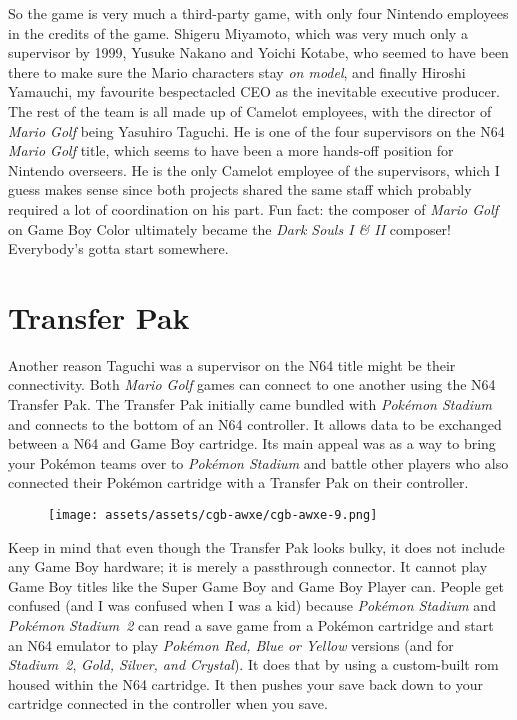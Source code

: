 \documentclass{book}
\begin{document}
So the game is very much a third-party game, with only four Nintendo employees in the credits of the game. Shigeru Miyamoto, which was very much only a supervisor by 1999, Yusuke Nakano and Yoichi Kotabe, who seemed to have been there to make sure the Mario characters stay \emph{on model}, and finally Hiroshi Yamauchi, my favourite bespectacled CEO as the inevitable executive producer. The rest of the team is all made up of Camelot employees, with the director of \emph{Mario Golf} being Yasuhiro Taguchi. He is one of the four supervisors on the N64 \emph{Mario Golf} title, which seems to have been a more hands-off position for Nintendo overseers. He is the only Camelot employee of the supervisors, which I guess makes sense since both projects shared the same staff which probably required a lot of coordination on his part. Fun fact: the composer of \emph{Mario Golf} on Game Boy Color ultimately became the \emph{Dark Souls I \& II} composer! Everybody’s gotta start somewhere.

\FloatBarrier\needspace{10mm}\section*{Transfer Pak}\nopagebreak[4]

Another reason Taguchi was a supervisor on the N64 title might be their connectivity. Both \emph{Mario Golf} games can connect to one another using the N64 Transfer Pak. The Transfer Pak initially came bundled with \emph{Pokémon Stadium} and connects to the bottom of an N64 controller. It allows data to be exchanged between a N64 and Game Boy cartridge. Its main appeal was as a way to bring your Pokémon teams over to \emph{Pokémon Stadium} and battle other players who also connected their Pokémon cartridge with a Transfer Pak on their controller.

\begin{figure}[hbt]
\vskip 10pt
\centering \texttt{[image: assets/assets/cgb-awxe/cgb-awxe-9.png]}
\vskip 6pt
\end{figure}

Keep in mind that even though the Transfer Pak looks bulky, it does not include any Game Boy hardware; it is merely a passthrough connector. It cannot play Game Boy titles like the Super Game Boy and Game Boy Player can. People get confused (and I was confused when I was a kid) because \emph{Pokémon Stadium} and \emph{Pokémon Stadium~2} can read a save game from a Pokémon cartridge and start an N64 emulator to play \emph{Pokémon Red, Blue or Yellow} versions (and for \emph{Stadium~2}, \emph{Gold, Silver, and Crystal}). It does that by using a custom-built rom housed within the N64 cartridge. It then pushes your save back down to your cartridge connected in the controller when you save.
\end{document}
